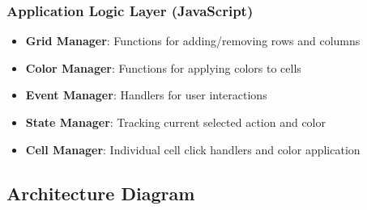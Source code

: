 \documentclass[11pt,a4paper]{article}
\begin{document}
\subsubsection{Application Logic Layer (JavaScript)}
\begin{itemize}[leftmargin=*]
    \item \textbf{Grid Manager}: Functions for adding/removing rows and columns
    \item \textbf{Color Manager}: Functions for applying colors to cells
    \item \textbf{Event Manager}: Handlers for user interactions
    \item \textbf{State Manager}: Tracking current selected action and color
    \item \textbf{Cell Manager}: Individual cell click handlers and color application
\end{itemize}

\subsection{Architecture Diagram}
\end{document}
